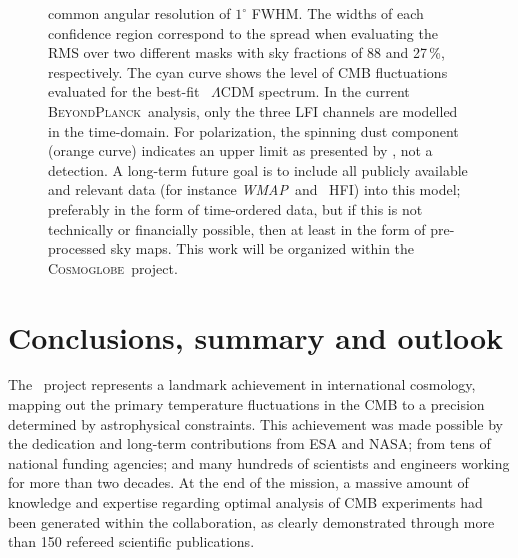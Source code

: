 \documentclass[twocolumn]{aa}
\def\WMAP{\emph{WMAP}}
\newcommand{\BP}{\textsc{BeyondPlanck}}
\newcommand{\cosmoglobe}{\textsc{Cosmoglobe}}
\begin{document}
\begin{figure}[t]
{    common angular resolution of $1^{\circ}$ FWHM. The widths of each
    confidence region correspond to the spread when evaluating the RMS
    over two different masks with sky fractions of 88 and 27\,\%,
    respectively.  The cyan curve shows the level of CMB fluctuations
    evaluated for the best-fit \Planck\ $\Lambda$CDM spectrum. In the
    current \BP\ analysis, only the three LFI channels are modelled in
    the time-domain. For polarization, the spinning dust component
    (orange curve) indicates an upper limit as presented by \citet{bp15},
    not a detection. A long-term future goal is to include all
    publicly available and relevant data (for instance \WMAP\ and
    \Planck\ HFI) into this model; preferably in the form of
    time-ordered data, but if this is not technically or financially
    possible, then at least in the form of pre-processed sky
    maps. This work will be organized within the
    \cosmoglobe\ project.}
  \label{fig:overview_fg}
\end{figure}


\section{Conclusions, summary and outlook}
\label{sec:conclusions}

The \Planck\ project represents a landmark achievement in
international cosmology, mapping out the primary temperature
fluctuations in the CMB to a precision determined by astrophysical
constraints. This achievement was made possible by the dedication and
long-term contributions from ESA and NASA; from tens of national
funding agencies; and many hundreds of scientists and engineers
working for more than two decades. At the end of the mission, a
massive amount of knowledge and expertise regarding optimal analysis
of CMB experiments had been generated within the collaboration, as
clearly demonstrated through more than 150 refereed scientific publications.
\end{document}
